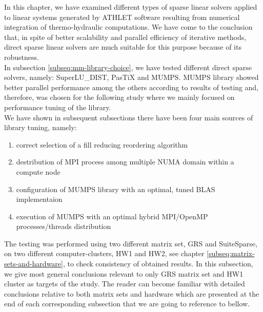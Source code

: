 \label{subseq:mm-conclusion}

In this chapter, we have examined different types of sparse linear solvers applied to linear systems generated by ATHLET software resulting from numerical integration of thermo-hydraulic computations. We have come to the conclusion that, in spite of better scalability and parallel efficiency of iterative methods, direct sparse linear solvers are much suitable for this purpose because of its robustness.\\


In subsection \ref{subseq:mm-library-choice}, we have tested different direct sparse solvers, namely: SuperLU\_DIST, PasTiX and MUMPS. MUMPS library showed better parallel performance among the others according to results of testing and, therefore, was chosen for the following study where we mainly focused on performance tuning of the library.\\


We have shown in subsequent subsections there have been four main sources of library tuning, namely:

\begin{enumerate}
	\item correct selection of a fill reducing reordering algorithm \label{conclusion:mm-1}
	\item destribution of MPI process among multiple NUMA domain within a compute node \label{conclusion:mm-2}
	\item configuration of MUMPS library with an optimal, tuned BLAS implementaion \label{conclusion:mm-3}
	\item execution of MUMPS with an optimal hybrid MPI/OpenMP processes/threads distribution \label{conclusion:mm-4}
\end{enumerate}


The testing was performed using two different matrix set, GRS and SuiteSparse, on two different computer-clusters, HW1 and HW2, see chapter \ref{subseq:matrix-sets-and-hardware}, to check consistency of obtained results. In this subsection, we  give most general conclusions relevant to only GRS matrix set and HW1 cluster as targets of the study. The reader can become familiar with detailed conclusions relative to both matrix sets and hardware which are presented at the end of each corresponding subsection that we are going to reference to bellow.\\




